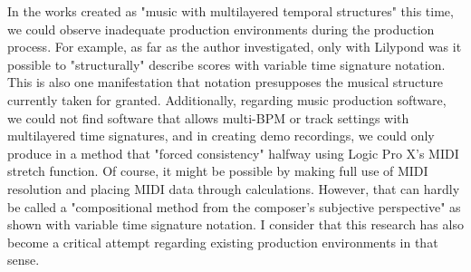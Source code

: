 In the works created as "music with multilayered temporal structures" this time, we could observe inadequate production environments during the production process. For example, as far as the author investigated, only with Lilypond was it possible to "structurally" describe scores with variable time signature notation. This is also one manifestation that notation presupposes the musical structure currently taken for granted. Additionally, regarding music production software, we could not find software that allows multi-BPM or track settings with multilayered time signatures, and in creating demo recordings, we could only produce in a method that "forced consistency" halfway using Logic Pro X's MIDI stretch function. Of course, it might be possible by making full use of MIDI resolution and placing MIDI data through calculations. However, that can hardly be called a "compositional method from the composer's subjective perspective" as shown with variable time signature notation. I consider that this research has also become a critical attempt regarding existing production environments in that sense.
